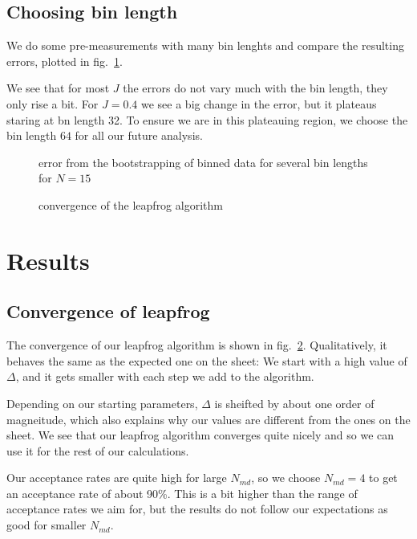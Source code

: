 \documentclass{scrartcl}
\begin{document}
\subsection{Choosing bin length}

We do some pre-measurements with many bin lenghts and compare the resulting errors, plotted in fig.~\ref{fig:bootstrap}.

We see that for most $J$ the errors do not vary much with the bin length, they only rise a bit. For $J=0.4$ we see a big change in the error, but it plateaus staring at bn length 32. To ensure we are in this plateauing region, we choose the bin length $64$ for all our future analysis.

\begin{figure}[htbp]
	
	\caption[error for different bin lengths]{error from the bootstrapping of binned data for several bin lengths for $N=15$}
	\label{fig:bootstrap}
\end{figure}

\begin{figure}[htbp]
	
	\caption{convergence of the leapfrog algorithm}
	\label{fig:converge}
\end{figure}

\section{Results}

\subsection{Convergence of leapfrog}

The convergence of our leapfrog algorithm is shown in fig.~\ref{fig:converge}. Qualitatively, it behaves the same as the expected one on the sheet: We start with a high value of $\Delta$, and it gets smaller with each step we add to the algorithm. 

Depending on our starting parameters, $\Delta$ is sheifted by about one order of magneitude, which also explains why our values are different from the ones on the sheet.
We see that our leapfrog algorithm converges quite nicely and so we can use it for the rest of our calculations.


Our acceptance rates are quite high for large $N_{md}$, so we choose $N_{md}=4$ to get an acceptance rate of about 90\%. This is a bit higher than the range of acceptance rates we aim for, but the results do not follow our expectations as good for smaller $N_{md}$.
\end{document}
